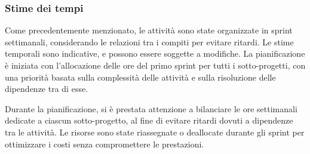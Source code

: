 \subsubsection{Stime dei tempi}
Come precedentemente menzionato, le attività sono state organizzate in sprint settimanali, considerando le relazioni tra i compiti 
per evitare ritardi. Le stime temporali sono indicative, e possono essere soggette a modifiche. La pianificazione è iniziata con 
l'allocazione delle ore del primo sprint per tutti i sotto-progetti, con una priorità basata sulla complessità delle attività e 
sulla risoluzione delle dipendenze tra di esse.

Durante la pianificazione, si è prestata attenzione a bilanciare le ore settimanali dedicate a ciascun sotto-progetto, 
al fine di evitare ritardi dovuti a dipendenze tra le attività. Le risorse sono state riassegnate o deallocate durante gli sprint 
per ottimizzare i costi senza compromettere le prestazioni.

